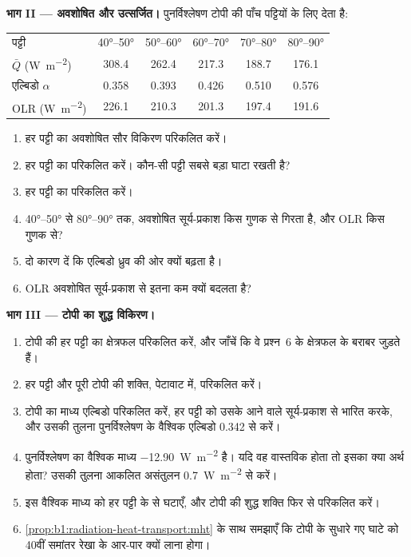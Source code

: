 \begin{problem}
\medskip
\noindent\textbf{भाग II --- अवशोषित और उत्सर्जित।} पुनर्विश्लेषण टोपी की पाँच पट्टियों के लिए देता है:
\begin{center}
\small
\begin{tabular}{|l|ccccc|}
\hline
पट्टी & \ang{40}--\ang{50} & \ang{50}--\ang{60} & \ang{60}--\ang{70} & \ang{70}--\ang{80} & \ang{80}--\ang{90} \\
$\bar Q$ (\unit{W.m^{-2}}) & 308.4 & 262.4 & 217.3 & 188.7 & 176.1 \\
एल्बिडो $\alpha$ & 0.358 & 0.393 & 0.426 & 0.510 & 0.576 \\
OLR (\unit{W.m^{-2}}) & 226.1 & 210.3 & 201.3 & 197.4 & 191.6 \\
\hline
\end{tabular}
\end{center}
\begin{enumerate}[resume]
  \item हर पट्टी का अवशोषित सौर विकिरण परिकलित करें।
  \item हर पट्टी का  परिकलित करें। कौन-सी पट्टी सबसे बड़ा
        घाटा रखती है?
  \item हर पट्टी का  परिकलित करें।
  \item \ang{40}--\ang{50} से \ang{80}--\ang{90} तक, अवशोषित सूर्य-प्रकाश किस गुणक से गिरता है, और OLR किस गुणक से?
  \item दो कारण दें कि एल्बिडो ध्रुव की ओर क्यों बढ़ता है।
  \item OLR अवशोषित सूर्य-प्रकाश से इतना कम क्यों बदलता है?
\end{enumerate}

\medskip
\noindent\textbf{भाग III --- टोपी का शुद्ध विकिरण।}
\begin{enumerate}[resume]
  \item टोपी की हर पट्टी का क्षेत्रफल परिकलित करें, और जाँचें कि वे प्रश्न~6 के
        क्षेत्रफल के बराबर जुड़ते हैं।
  \item हर पट्टी और पूरी टोपी की  शक्ति, पेटावाट में, परिकलित करें।
  \item टोपी का माध्य एल्बिडो परिकलित करें, हर पट्टी को उसके आने वाले सूर्य-प्रकाश से भारित करके, और उसकी तुलना पुनर्विश्लेषण के वैश्विक एल्बिडो \num{0.342} से करें।
  \item पुनर्विश्लेषण का वैश्विक माध्य  \qty{-12.90}{W.m^{-2}} है। यदि वह वास्तविक होता तो इसका क्या अर्थ होता? उसकी तुलना आकलित असंतुलन \qty{+0.7}{W.m^{-2}} से करें।
  \item इस वैश्विक माध्य को हर पट्टी के  से घटाएँ, और टोपी की शुद्ध शक्ति फिर से परिकलित करें।
  \item \cref{prop:b1:radiation-heat-transport:mht} के साथ समझाएँ कि टोपी के सुधारे गए घाटे को 40वीं समांतर रेखा के आर-पार क्यों लाना होगा।
\end{enumerate}


\end{problem}

